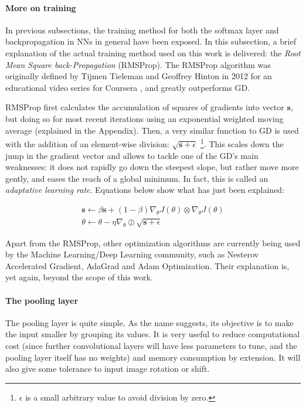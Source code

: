 \documentclass[../main.tex]{subfiles}
\begin{document}
\paragraph{More on training}
In previous subsections, the training method for both the softmax layer and backpropagation in NNs in general have been exposed. In this subsection, a brief explanation of the actual training method used on this work is delivered: the \textit{Root Mean Square back-Propagation} (RMSProp). The RMSProp algorithm was originally defined by Tijmen Tieleman and Geoffrey Hinton in 2012 for an educational video series for Coursera \cite{RMSProp_Coursera}, and greatly outperforms GD. 

RMSProp first calculates the accumulation of squares of gradients into vector $\textbf{s}$, but doing so for most recent iterations using an exponential weighted moving average (explained in the Appendix). Then, a very similar function to GD is used with the addition of an element-wise division: $\sqrt{\textbf{s} + \epsilon}$ \footnote{$\epsilon$ is a small arbitrary value to avoid division by zero.}. This scales down the jump in the gradient vector and allows to tackle one of the GD's main weaknesses: it does not rapidly go down the steepest slope, but rather move more gently, and eases the reach of a global minimum. In fact, this is called an \textit{adaptative learning rate}. Equations below show what has just been explained:

\begin{eqnarray} \label{eqn:GD_example_for_MSE}
    \textbf{s} \leftarrow \beta \textbf{s} + (1-\beta) \nabla_{\theta} J(\theta) \otimes \nabla_{\theta} J(\theta) \\
    \theta \leftarrow \theta - \eta \nabla_{\theta} \oslash \sqrt{\textbf{s} + \epsilon}
\end{eqnarray}

Apart from the RMSProp, other optimization algorithms are currently being used by the Machine Learning/Deep Learning community, such as Nesterov Accelerated Gradient, AdaGrad and Adam Optimization. Their explanation is, yet again, beyond the scope of this work.



\paragraph{The pooling layer}
The pooling layer is quite simple. As the name suggests, its objective is to make the input smaller by grouping its values. It is very useful to reduce computational cost (since further convolutional layers will have less parameters to tune, and the pooling layer itself has no weights) and memory consumption by extension. It will also give some tolerance to input image rotation or shift.
\end{document}
